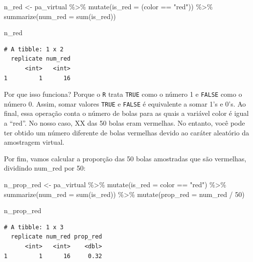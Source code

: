 \documentclass[
  letterpaper,
  DIV=11,
  numbers=noendperiod]{scrreprt}
\newenvironment{Shaded}{\begin{snugshade}}{\end{snugshade}}
\newcommand{\AttributeTok}[1]{\textcolor[rgb]{0.40,0.45,0.13}{#1}}
\newcommand{\DecValTok}[1]{\textcolor[rgb]{0.68,0.00,0.00}{#1}}
\newcommand{\FunctionTok}[1]{\textcolor[rgb]{0.28,0.35,0.67}{#1}}
\newcommand{\NormalTok}[1]{\textcolor[rgb]{0.00,0.23,0.31}{#1}}
\newcommand{\OtherTok}[1]{\textcolor[rgb]{0.00,0.23,0.31}{#1}}
\newcommand{\SpecialCharTok}[1]{\textcolor[rgb]{0.37,0.37,0.37}{#1}}
\newcommand{\StringTok}[1]{\textcolor[rgb]{0.13,0.47,0.30}{#1}}
\begin{document}
\begin{Shaded}
\begin{Highlighting}[]
\NormalTok{n\_red }\OtherTok{\textless{}{-}}\NormalTok{ pa\_virtual }\SpecialCharTok{\%\textgreater{}\%}
\FunctionTok{mutate}\NormalTok{(}\AttributeTok{is\_red =}\NormalTok{ (color }\SpecialCharTok{==} \StringTok{"red"}\NormalTok{)) }\SpecialCharTok{\%\textgreater{}\%}
\FunctionTok{summarize}\NormalTok{(}\AttributeTok{num\_red =} \FunctionTok{sum}\NormalTok{(is\_red))}

\NormalTok{n\_red}
\end{Highlighting}
\end{Shaded}

\begin{verbatim}
# A tibble: 1 x 2
  replicate num_red
      <int>   <int>
1         1      16
\end{verbatim}

Por que isso funciona? Porque o \texttt{R} trata \texttt{TRUE} como o
número 1 e \texttt{FALSE} como o número 0. Assim, somar valores
\texttt{TRUE} e \texttt{FALSE} é equivalente a somar 1's e 0's. Ao
final, essa operação conta o número de bolas para as quais a variável
color é igual a ``red''. No nosso caso, XX das 50 bolas eram vermelhas.
No entanto, você pode ter obtido um número diferente de bolas vermelhas
devido ao caráter aleatório da amostragem virtual.

Por fim, vamos calcular a proporção das 50 bolas amostradas que são
vermelhas, dividindo num\_red por 50:

\begin{Shaded}
\begin{Highlighting}[]
\NormalTok{n\_prop\_red }\OtherTok{\textless{}{-}}\NormalTok{ pa\_virtual }\SpecialCharTok{\%\textgreater{}\%}
\FunctionTok{mutate}\NormalTok{(}\AttributeTok{is\_red =}\NormalTok{ color }\SpecialCharTok{==} \StringTok{"red"}\NormalTok{) }\SpecialCharTok{\%\textgreater{}\%}
\FunctionTok{summarize}\NormalTok{(}\AttributeTok{num\_red =} \FunctionTok{sum}\NormalTok{(is\_red)) }\SpecialCharTok{\%\textgreater{}\%}
\FunctionTok{mutate}\NormalTok{(}\AttributeTok{prop\_red =}\NormalTok{ num\_red }\SpecialCharTok{/} \DecValTok{50}\NormalTok{)}

\NormalTok{n\_prop\_red}
\end{Highlighting}
\end{Shaded}

\begin{verbatim}
# A tibble: 1 x 3
  replicate num_red prop_red
      <int>   <int>    <dbl>
1         1      16     0.32
\end{verbatim}
\end{document}
